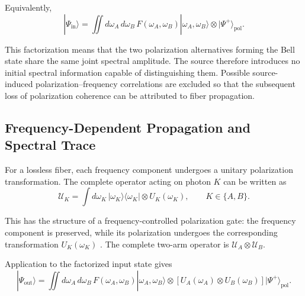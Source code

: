 Equivalently,
%
\begin{equation}
    |\Psi_{\mathrm{in}}\rangle
    =
    \iint
    d\omega_A\,d\omega_B\,
    F(\omega_A,\omega_B)
    |\omega_A,\omega_B\rangle
    \otimes
    |\Psi^+\rangle_{\mathrm{pol}}.
    \label{eq:complete_spdc_input_state_integral}
\end{equation}

This factorization means that the two polarization alternatives forming the
Bell state share the same joint spectral amplitude. The source therefore
introduces no initial spectral information capable of distinguishing them.
Possible source-induced polarization--frequency correlations are excluded
so that the subsequent loss of polarization coherence can be attributed to
fiber propagation.


\subsection{Frequency-Dependent Propagation and Spectral Trace}
\label{subsec:frequency_dependent_local_propagation}

For a lossless fiber, each frequency component undergoes a unitary
polarization transformation. The complete operator acting on photon \(K\)
can be written as
%
\begin{equation}
    \mathcal{U}_K
    =
    \int d\omega_K\,
    |\omega_K\rangle
    \langle\omega_K|
    \otimes
    U_K(\omega_K),
    \qquad
    K\in\{A,B\}.
    \label{eq:frequency_controlled_fiber_operator}
\end{equation}

This has the structure of a frequency-controlled polarization gate: the
frequency component is preserved, while its polarization undergoes the
corresponding transformation \(U_K(\omega_K)\)
\cite{poon_law_stochastic_pmd_2008}. The complete two-arm operator is
\(\mathcal{U}_A\otimes\mathcal{U}_B\).

Application to the factorized input state gives
%
\begin{equation}
    |\Psi_{\mathrm{out}}\rangle
    =
    \iint
    d\omega_A\,d\omega_B\,
    F(\omega_A,\omega_B)
    |\omega_A,\omega_B\rangle
    \otimes
    \left[
        U_A(\omega_A)
        \otimes
        U_B(\omega_B)
    \right]
    |\Psi^+\rangle_{\mathrm{pol}}.
    \label{eq:frequency_dependent_spdc_output_state}
\end{equation}

